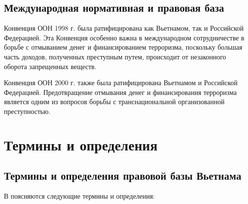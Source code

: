 \documentclass{article}
\begin{document}

\hfill

\subsection{Международная нормативная и правовая база}

Конвенция ООН 1998 г. \cite{unc88} была ратифицирована как Вьетнамом, так и Российской Федерацией. Эта Конвенция особенно важна в международном сотрудничестве в борьбе с отмыванием денег и финансированием терроризма, поскольку большая часть доходов, полученных преступным путем, происходит от незаконного оборота запрещенных веществ.


Конвенция ООН 2000 г. \cite{unc00} также была ратифицирована Вьетнамом и Российской Федерацией. Предотвращение отмывания денег и финансирования терроризма является одним из вопросов борьбы с транснациональной организованной преступностью.



\newpage

\section{Термины и определения}

\hfill

\subsection{Термины и определения правовой базы Вьетнама}

В \cite{law14} поясняются следующие термины и определения:
\end{document}
